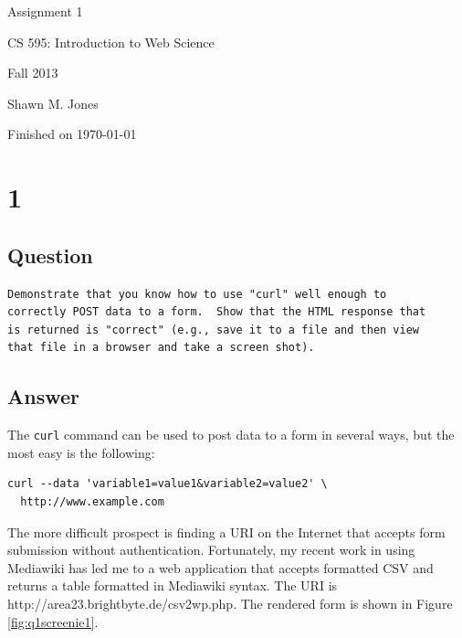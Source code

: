 \documentclass[letterpaper,11pt]{article}
\begin{document}
\begin{titlepage}

\begin{center}

\Huge{Assignment 1}

\Large{CS 595:  Introduction to Web Science}

\Large{Fall 2013}

\Large{Shawn M. Jones}

\Large Finished on \today

\end{center}

\end{titlepage}

\newpage
\section*{1}

\subsection*{Question}

\begin{verbatim}
Demonstrate that you know how to use "curl" well enough to
correctly POST data to a form.  Show that the HTML response that
is returned is "correct" (e.g., save it to a file and then view
that file in a browser and take a screen shot).
\end{verbatim}

\newpage
\subsection*{Answer}

The \verb+curl+ command can be used to post data to a form in several ways, but the most easy is the following:
\begin{lstlisting}[frame=single]
curl --data 'variable1=value1&variable2=value2' \
  http://www.example.com
\end{lstlisting}

The more difficult prospect is finding a URI on the Internet that accepts form submission without authentication.  Fortunately, my recent work in using Mediawiki has led me to a web application that accepts formatted CSV and returns a table formatted in Mediawiki syntax.  The URI is http://area23.brightbyte.de/csv2wp.php.  The rendered form is shown in Figure \ref{fig:q1screenie1}.
\end{document}

